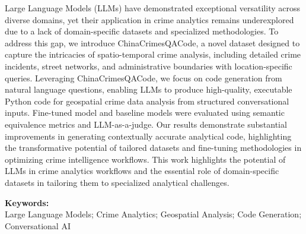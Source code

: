 

Large Language Models (LLMs) have demonstrated exceptional versatility across diverse domains, yet their application in crime analytics remains underexplored due to a lack of domain-specific datasets and specialized methodologies. To address this gap, we introduce ChinaCrimesQACode, a novel dataset designed to capture the intricacies of spatio-temporal crime analysis, including detailed crime incidents, street networks, and administrative boundaries with location-specific queries. Leveraging ChinaCrimesQACode, we focus on code generation from natural language questions, enabling LLMs to produce high-quality, executable Python code for geospatial crime data analysis from structured conversational inputs. Fine-tuned model and baseline models were evaluated using semantic equivalence metrics and LLM-as-a-judge. Our results demonstrate substantial improvements in generating contextually accurate analytical code, highlighting the transformative potential of tailored datasets and fine-tuning methodologies in optimizing crime intelligence workflows. This work highlights the potential of LLMs in crime analytics workflows and the essential role of domain-specific datasets in tailoring them to specialized analytical challenges.

\noindent \textbf{Keywords:}\\
\noindent Large Language Models; Crime Analytics; Geospatial Analysis; Code Generation; Conversational AI